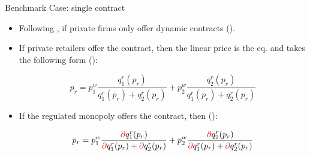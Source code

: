 \documentclass{class}
\begin{document}





\begin{frame}{Benchmark Case: single contract}

\begin{itemize}

\item Following \cite{joskow2006retail}, if private firms only offer dynamic contracts (). \vfill

\item If private retailers offer the contract, then the linear price is the eq. and takes the following form ():

\begin{equation*}
 p_r = p_1^w  \frac{q_1^r(p_r)}{ q_1^r(p_r) + q_2^r(p_r) } + p_2^w \frac{ q_2^r(p_r)}{ q_1^r(p_r) + q_2^r(p_r) }
\end{equation*}

\vfill

\item If the regulated monopoly offers the contract, then (): 

\begin{equation*}
 p_r = p_1^w \frac{ \textcolor{red}{\partial} q_1^{r}(p_r)}{ \textcolor{red}{\partial} q_1^{r}(p_r) + \textcolor{red}{\partial} q_2^{r}(p_r) } + p_2^w\frac{ \textcolor{red}{\partial} q_2^{r}(p_r)}{ \textcolor{red}{\partial} q_1^{r}(p_r) + \textcolor{red}{\partial} q_2^{r}(p_r) }
 \end{equation*}

\end{itemize}

\end{frame}
\end{document}
